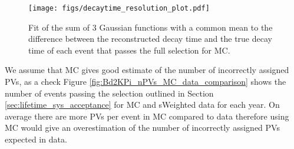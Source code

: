 {\begin{figure}[h]
\centering
  \texttt{[image: figs/decaytime\_resolution\_plot.pdf]}
\caption{Fit of the sum of 3 Gaussian functions with a common mean to the difference between the reconstructed decay time and the true decay time of each event that passes the full selection for \bsmumu MC. }
\label{fig:resolution_fit_plot}
\end{figure}

 We assume that MC gives good estimate of the number of incorrectly assigned PVs, as a check Figure \ref{fig:Bd2KPi_nPVs_MC_data_comparison} shows the number of \bdkpi events passing the selection outlined in Section \ref{sec:lifetime_sys_acceptance} for MC and sWeighted data for each year. On average there are more PVs per event in MC compared to data therefore using MC would give an overestimation of the number of incorrectly assigned PVs expected in data. 

}
